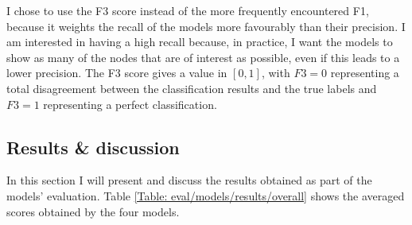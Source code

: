 		I chose to use the F3 score instead of the more frequently encountered F1, because it weights the recall of the models more favourably than their precision. I am interested in having a high recall because, in practice, I want the models to show as many of the nodes that are of interest as possible, even if this leads to a lower precision. The F3 score gives a value in $[0, 1]$, with $F3 = 0$ representing a total disagreement between the classification results and the true labels and $F3 = 1$ representing a perfect classification.
		
		\subsection{Results \& discussion} \label{Section: eval/ml/results}
		In this section I will present and discuss the results obtained as part of the models' evaluation. Table \ref{Table: eval/models/results/overall} shows the averaged scores obtained by the four models. 
		
